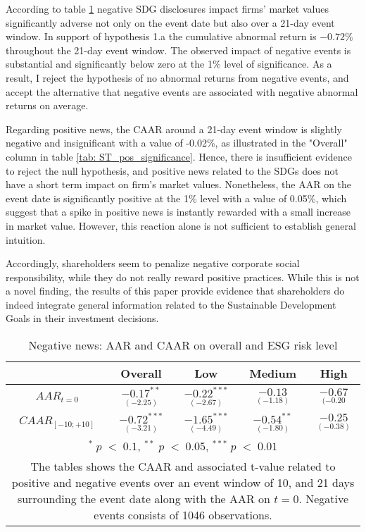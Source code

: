 According to table \ref{tab: ST_neg_significance} negative SDG disclosures impact firms' market values significantly adverse not only on the event date but also over a 21-day event window. In support of hypothesis 1.a the cumulative abnormal return is $-0.72\%$ throughout the 21-day event window. The observed impact of negative events is substantial and significantly below zero at the 1\% level of significance. As a result, I reject the hypothesis of no abnormal returns from negative events, and accept the alternative that negative events are associated with negative abnormal returns on average. 

Regarding positive news, the CAAR around a 21-day event window is slightly negative and insignificant with a value of -0.02\%, as illustrated in the "Overall" column in table \ref{tab: ST_pos_significance}. Hence, there is insufficient evidence to reject the null hypothesis, and positive news related to the SDGs does not have a short term impact on firm's market values. Nonetheless, the AAR on the event date is significantly positive at the 1\% level with a value of 0.05\%, which suggest that a spike in positive news is instantly rewarded with a small increase in market value. However, this reaction alone is not sufficient to establish general intuition.

\noindent Accordingly, shareholders seem to penalize negative corporate social responsibility, while they do not really reward positive practices. While this is not a novel finding, the results of this paper provide evidence that shareholders do indeed integrate general information related to the Sustainable Development Goals in their investment decisions. 

\begin{table}[H]
\centering
\caption{Negative news: AAR and CAAR on overall and ESG risk level} 
\begin{tabular}{ccccc}
  \hline  \hline
  & \multicolumn{1}{c}{Overall} &  \multicolumn{1}{c}{Low} & \multicolumn{1}{c}{Medium} & \multicolumn{1}{c}{High}\\  
 \hline
$AAR_{t=0}$ &   $\underset{(-2.25)}{-0.17^{**}}$ &   $\underset{(-2.67)}{-0.22^{***}}$ &   $\underset{(-1.18)}{-0.13}$ &   $\underset{(-0.20}{-0.67 }$ \\
$CAAR_{[-10;+10]}$    & $\underset{(-3.21)}{-0.72^{***}}$ &   $\underset{(-4.49)}{-1.65^{***}}$ &   $\underset{(-1.80)}{-0.54^{**}}$ &   $\underset{(-0.38)}{-0.25}$ \\ 
   \hline \hline
   \multicolumn{5}{p{12cm}}{ \footnotesize $^* \; p\; <\; 0.1$, $ ^{**} \; p\; <\; 0.05$, $ ^{***} \; p\; <\; 0.01$  } \\
   \multicolumn{5}{p{13cm}}{\footnotesize The tables shows the CAAR and associated t-value related to positive and negative events over an event window of 10, and 21 days surrounding the event date along with the AAR on $t=0$. Negative events consists of 1046 observations. } \\
   \hline
\end{tabular}
\label{tab: ST_neg_significance}
\end{table}

